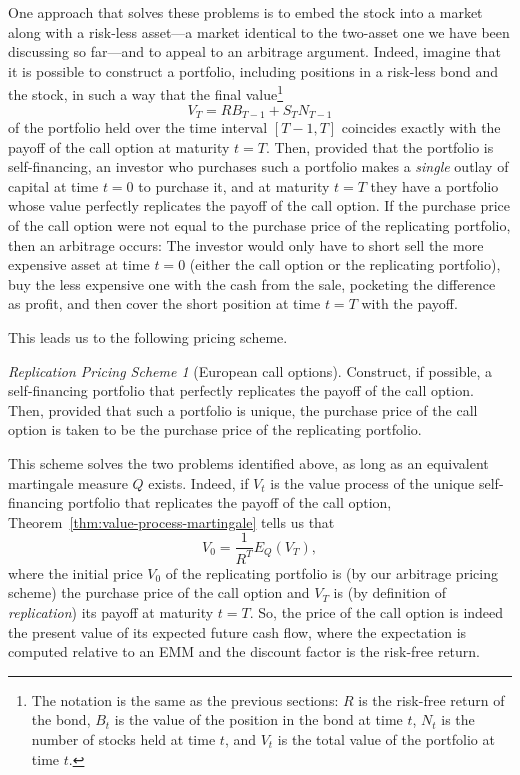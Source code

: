 \documentclass[11pt, openany, oneside]{book}
\theoremstyle{definition}
\theoremstyle{remark}
\theoremstyle{boldital}
\newtheorem*{replication}{Replication Pricing Scheme}
\numberwithin{equation}{section}
\begin{document}
One approach that solves these problems is to embed the stock into a market along with a risk-less asset---a market identical to the two-asset one we have been discussing so far---and to appeal to an arbitrage argument. Indeed, imagine that it is possible to construct a portfolio, including positions in a risk-less bond and the stock, in such a way that the final value\footnote{The notation is the same as the previous sections: $R$ is the risk-free return of the bond, $B_t$ is the value of the position in the bond at time $t$, $N_t$ is the number of stocks held at time $t$, and $V_t$ is the total value of the portfolio at time $t$.}
	\[
	V_T = RB_{T-1} + S_{T} N_{T-1}
	\]
of the portfolio held over the time interval $[T-1, T]$ coincides exactly with the payoff of the call option at maturity $t=T$. Then, provided that the portfolio is self-financing, an investor who purchases such a portfolio makes a \textit{single} outlay of capital at time $t=0$ to purchase it, and at maturity $t=T$ they have a portfolio whose value perfectly replicates the payoff of the call option. If the purchase price of the call option were not equal to the purchase price of the replicating portfolio, then an arbitrage occurs: The investor would only have to short sell the more expensive asset at time $t=0$ (either the call option or the replicating portfolio), buy the less expensive one with the cash from the sale, pocketing the difference as profit, and then cover the short position at time $t=T$ with the payoff.

This leads us to the following pricing scheme.

\begin{replication}[European call options]
Construct, if possible, a self-financing portfolio that perfectly replicates the payoff of the call option. Then, provided that such a portfolio is unique, the purchase price of the call option is taken to be the purchase price of the replicating portfolio.
\end{replication}

This scheme solves the two problems identified above, as long as an equivalent martingale measure $Q$ exists. Indeed, if $V_t$ is the value process of the unique self-financing portfolio that replicates the payoff of the call option, Theorem~\ref{thm:value-process-martingale} tells us that
\[
	V_0 = \frac{1}{R^T}E_Q(V_T),
\]
where the initial price $V_0$ of the replicating portfolio is (by our arbitrage pricing scheme) the purchase price of the call option and $V_T$ is (by definition of \textit{replication}) its payoff at maturity $t=T$. So, the price of the call option is indeed the present value of its expected future cash flow, where the expectation is computed relative to an EMM and the discount factor is the risk-free return.
\end{document}
